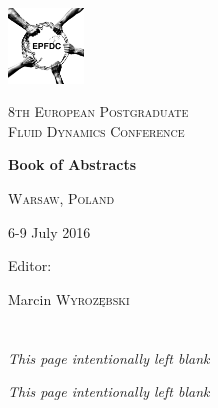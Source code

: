 \documentclass[11pt,a4paper]{article}
\numberwithin{equation}{section}
\begin{document}
\pagestyle{plain}


\newpage 

\begin{titlepage}
	\centering
	\includegraphics[width=0.15\textwidth]{../logo.png}\par\vspace{1cm}
	{\scshape\LARGE 8th European Postgraduate\\Fluid Dynamics Conference \par}	
	
	
	\vspace{1.5cm}
	{\Huge\bfseries Book of Abstracts\par}
	\vspace{2cm}

	\vspace{1cm}
	{\scshape\Large Warsaw, Poland\par}
	{\Large 6-9 July 2016\par}
	\vfill
	Editor:\par
	Marcin \textsc{Wyrozębski}


\end{titlepage}

\newpage 


\newpage 


\newpage


\newpage


\newpage

\tableofcontents
\newpage 

%
\section*{}
\vfill
\begin{center}
	\textit{This page intentionally left blank}
\end{center}
\newpage





\vfill
\begin{center}
	\textit{This page intentionally left blank}
\end{center}
\newpage


\end{document}
